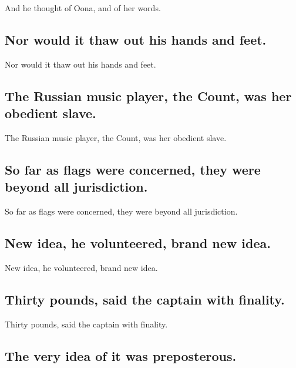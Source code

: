 \documentclass[]{article}
\begin{document}
And he thought of Oona, and of her words.

\hypertarget{nor-would-it-thaw-out-his-hands-and-feet.}{%
\subsection{Nor would it thaw out his hands and
feet.}\label{nor-would-it-thaw-out-his-hands-and-feet.}}

Nor would it thaw out his hands and feet.

\hypertarget{the-russian-music-player-the-count-was-her-obedient-slave.}{%
\subsection{The Russian music player, the Count, was her obedient
slave.}\label{the-russian-music-player-the-count-was-her-obedient-slave.}}

The Russian music player, the Count, was her obedient slave.

\hypertarget{so-far-as-flags-were-concerned-they-were-beyond-all-jurisdiction.}{%
\subsection{So far as flags were concerned, they were beyond all
jurisdiction.}\label{so-far-as-flags-were-concerned-they-were-beyond-all-jurisdiction.}}

So far as flags were concerned, they were beyond all jurisdiction.

\hypertarget{new-idea-he-volunteered-brand-new-idea.}{%
\subsection{New idea, he volunteered, brand new
idea.}\label{new-idea-he-volunteered-brand-new-idea.}}

New idea, he volunteered, brand new idea.

\hypertarget{thirty-pounds-said-the-captain-with-finality.}{%
\subsection{Thirty pounds, said the captain with
finality.}\label{thirty-pounds-said-the-captain-with-finality.}}

Thirty pounds, said the captain with finality.

\hypertarget{the-very-idea-of-it-was-preposterous.}{%
\subsection{The very idea of it was
preposterous.}\label{the-very-idea-of-it-was-preposterous.}}
\end{document}
